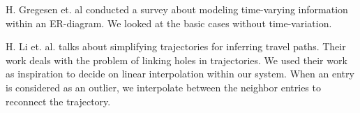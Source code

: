 H. Gregesen et. al conducted a survey about modeling time-varying information within an ER-diagram\cite{art:modeltimevary}. We looked at the basic cases without time-variation. 

H. Li et. al. talks about simplifying trajectories for inferring travel paths. Their work deals with the problem of linking holes in trajectories. We used their work as inspiration to decide on linear interpolation within our system. When an entry is considered as an outlier, we interpolate between the neighbor entries to reconnect the trajectory.

\begin{comment}
RELATED WORK
another article underbuildning PAYD because it says it reduces influence on the community
\cite{art:vehicfeacosben}

Looks at different pricing methods
Mainly look at usage in terms of distance driven.
\cite{art:PAYDVehInsur}

talks about descreasing premium cost for users who dont drive that far each year
\cite{art:PAYDafford}

justification and effects of PAYD on equity and lowering harms
\cite{art:PAYDredharms}

Generelt snak om UBI på et konceptuelt plan
\cite{art:telematicsmatter}
\cite{mar:telematics12}
\cite{mar:ubi13}
\cite{mar:ubi16}


The most similar research compared to what we did. They talk about a bundle of metrics, not completely similar to ours, because they also consider available spatial data. They also talk about launching UBI from a smartphone and the stability issues regarding this way of logging. A comparison of signal coverage/available is also presented.
Insurance Telematics - Opportunities and challenges with the smartphone solution
\cite{art:insurtelematics}



Road vehicle traffic probing done through smartphone, funded through facilitating UBI, what metrics to use but not a calculation or storage
acceleration, braking, smoothness, cornering, swerving, and speeding.
Smartphone-based measurement system
\cite{art:smartphonemonitor}

PriPAYD: Privacy-Friendly
Pay-As-You-Drive Insurance
local "in-box" calculations, aggregated data sent to the insurance company
provides a list of PAYD implementations
focus on how to secure the data in the box, not how to store and price
\cite{art:PriPAYDprivacy}


Talks about modeling temporal data within an ER diagram.
(propose time-varying, but also the basic case which we use)
CONCEPTUAL MODELLINGof time-varying information
\cite{art:modeltimevary}

We use this article to decide on linear interpolation
Spatio-Temporal Trajectory Simplification for Inferring Travel Paths
\cite{art:inftravelpath}

\end{comment}